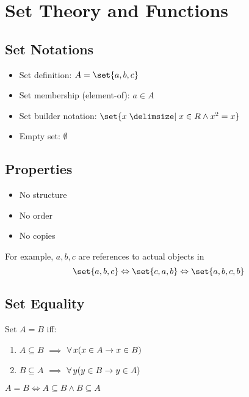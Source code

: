 \section{Set Theory and Functions}

\subsection{Set Notations}
\begin{itemize}
    \item Set definition: $A = \set{a, b, c}$
    \item Set membership (element-of): $a \in A$
    \item Set builder notation: $\set{x \given x \in \Real \land x^2 = x}$
    \item Empty set: $\emptyset$
\end{itemize}

\subsection{Properties}
\begin{itemize}
    \item No structure
    \item No order
    \item No copies
\end{itemize}

For example, $a, b, c$ are references to actual objects in
\begin{equation*}
    \set{a, b, c} \Leftrightarrow \set{c, a, b} \Leftrightarrow \set{a, b, c, b}
\end{equation*}

\subsection{Set Equality}
\begin{definition}
    Set $A = B$ iff:
    \begin{enumerate}
        \item $A \subseteq B$ $\implies$ $\operatorname{\forall} x (x \in A \to x \in B)$
        \item $B \subseteq A$ $\implies$ $\operatorname{\forall} y (y \in B \to y \in A)$
    \end{enumerate}
\end{definition}

\begin{remark}
    $A = B \Leftrightarrow A \subseteq B \land B \subseteq A$
\end{remark}

